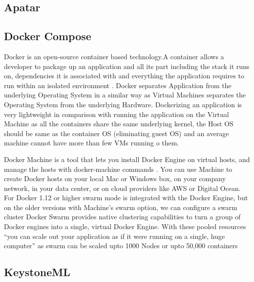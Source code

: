 \subsection{Apatar}
\subsection{Docker Compose}

    Docker is an open-source container based technology.A container
    allows a developer to package up an application and all its part
    including the stack it runs on, dependencies it is associated with
    and everything the application requires to run within an isolated
    environment . Docker separates Application from the underlying
    Operating System in a similar way as Virtual Machines separates
    the Operating System from the underlying Hardware. Dockerizing an
    application is very lightweight in comparison with running the
    application on the Virtual Machine as all the containers share the
    same underlying kernel, the Host OS should be same as the
    container OS (eliminating guest OS) and an average machine cannot
    have more than few VMs running o them.

    Docker Machine is a tool that lets you install Docker Engine on
    virtual hosts, and manage the hosts with docker-machine commands
    \cite{docker-book}. You can use Machine to create Docker hosts on
    your local Mac or Windows box, on your company network, in your
    data center, or on cloud providers like AWS or Digital Ocean. For
    Docker 1.12 or higher swarm mode is integrated with the Docker
    Engine, but on the older versions with Machine's swarm option, we
    can configure a swarm cluster Docker Swarm provides native
    clustering capabilities to turn a group of Docker engines into a
    single, virtual Docker Engine. With these pooled resources ``you
    can scale out your application as if it were running on a single,
    huge computer'' \cite{www-docker} as swarm can be scaled upto 1000
    Nodes or upto 50,000 containers
    
\subsection{KeystoneML}
    
